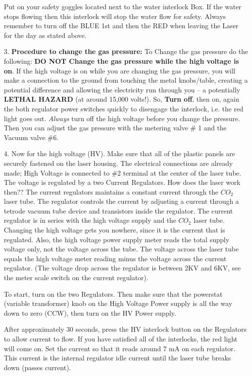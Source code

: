 \documentclass{../lab}
\begin{document}
Put on your safety goggles located next to the water interlock Box. If the water stops flowing then this interlock will stop the water flow for safety. Always remember to turn off the BLUE 1st and then the RED when leaving the Laser for the day as stated above.

3. \textbf{Procedure to change the gas pressure:} To Change the gas pressure do the following: \textbf{DO NOT Change the gas pressure while the high voltage is on}.  If the high voltage is on while you are changing the gas pressure, you will make a connection to the ground from touching the metal knobs/table, creating a potential difference and allowing the electricity run through you -- a potentially\textbf{ LETHAL HAZARD} (at around 15,000 volts!). So, \textbf{Turn off}, then on, again the both regulator power switches quickly to disengage the interlock, i.e. the red light goes out. \emph{Always} turn off the high voltage before you change the pressure. Then you can adjust the gas pressure with the metering valve \# 1 and the Vacuum valve \#6.

4. Now for the high voltage (HV). Make sure that all of the plastic panels are securely fastened on the laser housing. The electrical connections are already made; High Voltage is connected to \#2 terminal at the center of the laser tube. The voltage is regulated by a two Current Regulators. How does the laser work then?? The current regulators maintains a constant current through the $CO_2 $ laser tube. The regulator controls the current by adjusting a current through a tetrode vacuum tube device and transistors inside the regulator. The current regulator is in series with the high voltage supply and the $CO_2 $ laser tube. Changing the high voltage gets you nowhere, since it is the current that is regulated. Also, the high voltage power supply meter reads the total supply voltage only, not the voltage across the tube. The voltage across the laser tube equals the high voltage meter reading minus the voltage across the current regulator. (The voltage drop across the regulator is between 2KV and 6KV, see the meter scale switch on the current regulator).

To start, turn on the two Regulators. Then make sure that the powerstat (variable transformer) knob on the High Voltage Power supply is all the way down to zero (CCW), then turn on the HV Power supply.

After approximately 30 seconds, press the HV interlock button on the Regulators to allow current to flow. If you have satisfied all of the interlocks, the red light will come on. Set the current so that it reads around 7 mA on each regulator. This current is the internal regulator idle current until the laser tube breaks down (passes current).
\end{document}

